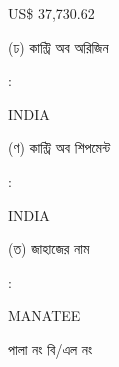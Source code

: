 \documentclass[12pt]{article}
\newcommand{\co}{INDIA}
\newcommand{\coship}{INDIA}
\newcommand{\vessel}{MANATEE}
\newcommand{\price}{US\$ 37,730.62}
\begin{document}
\begin{minipage}[t]{0.53\linewidth}
{\price}
\\
\end{minipage}
\begin{minipage}[t]{0.05\linewidth}
\hspace*{1em}
\end{minipage}
\begin{minipage}[t]{0.40\linewidth}
(ঢ) কান্ট্রি অব অরিজিন
\end{minipage}
\begin{minipage}[t]{0.02\linewidth}
:
\end{minipage}
\begin{minipage}[t]{0.53\linewidth}
{\co}
\\
\end{minipage}
\begin{minipage}[t]{0.05\linewidth}
\hspace*{1em}
\end{minipage}
\begin{minipage}[t]{0.40\linewidth}
(ণ) কান্ট্রি অব শিপমেন্ট
\end{minipage}
\begin{minipage}[t]{0.02\linewidth}
:
\end{minipage}
\begin{minipage}[t]{0.53\linewidth}
{\coship}
\\
\end{minipage}
\begin{minipage}[t]{0.05\linewidth}
\hspace*{1em}
\end{minipage}
\begin{minipage}[t]{0.40\linewidth}
(ত) জাহাজের নাম
\end{minipage}
\begin{minipage}[t]{0.02\linewidth}
:
\end{minipage}
\begin{minipage}[t]{0.53\linewidth}
{\vessel}
\end{minipage}
\begin{minipage}[t]{0.05\linewidth}
\hspace*{1em}
\end{minipage}
\begin{minipage}[t]{0.40\linewidth}
\hspace*{1.8em}পালা নং বি/এল নং
\end{minipage}
\begin{minipage}[t]{0.02\linewidth}
\hspace{1em}
\end{minipage}
\end{document}
